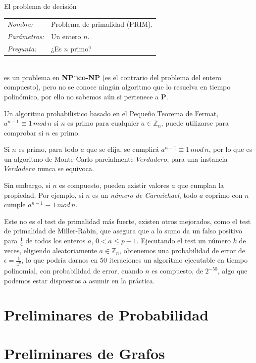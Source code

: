 \begin{example}
	El problema de decisión
	
	\begin{tabular}{|ll}
		\textit{Nombre:} & Problema de primalidad (PRIM). \\
		\textit{Parámetros:} & Un entero $n$. \\
		\textit{Pregunta:} & ¿Es $n$ primo? \\
	\end{tabular}
	\\
	es un problema en \textbf{NP}$\cap$\textbf{co-NP} (es el contrario del problema del entero compuesto), pero no se conoce ningún algoritmo que lo resuelva en tiempo polinómico, por ello no sabemos aún si pertenece a \textbf{P}.
	
	Un algoritmo probabilístico basado en el Pequeño Teorema de Fermat, $a^{n-1} \equiv 1 \, mod \, n$ si $n$ es primo para cualquier $a\in \mathbb{Z}_n$, puede utilizarse para comprobar si $n$ es primo.
	
	Si $n$ es primo, para todo $a$ que se elija, se cumplirá $a^{n-1} \equiv 1 \, mod \, n$, por lo que es un algoritmo de Monte Carlo parcialmente $Verdadero$, para una instancia $Verdadera$ nunca se equivoca.
	
	Sin embargo, si $n$ es compuesto, pueden existir valores $a$ que cumplan la propiedad. Por ejemplo, si $n$ es un \textit{número de Carmichael}, todo $a$ coprimo con $n$ cumple $a^{n-1} \equiv 1 \, mod \, n$.
	
	Este no es el test de primalidad más fuerte, existen otros mejorados, como el test de primalidad de Miller-Rabin, que asegura que a lo sumo da un falso positivo para $\frac{1}{4}$ de todos los enteros $a$, $0<a\leq p-1$. Ejecutando el test un número $k$ de veces, eligiendo aleatoriamente $a\in \mathbb{Z}_n$, obtenemos una probabilidad de error de $\epsilon=\frac{1}{4^k}$, lo que podría darnos en 50 iteraciones un algoritmo ejecutable en tiempo polinomial, con probabilidad de error, cuando $n$ es compuesto, de $2^{-50}$, algo que podemos estar dispuestos a asumir en la práctica.
	
\end{example}






%
%
%
%
%
%






\section{Preliminares de Probabilidad}








%
%
%
%
%
%




\section{Preliminares de Grafos}


